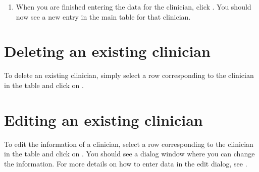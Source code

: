 \documentclass[letterpaper,10pt,english]{sphinxmanual}
\begin{document}
\begin{figure}[H]
\centering

\end{figure}
\begin{enumerate}
%
\setcounter{enumi}{3}
\item {} 
When you are finished entering the data for the clinician, click .
You should now see a new entry in the main table for that clinician.

\end{enumerate}

\begin{figure}[H]
\centering

\end{figure}


\section{Deleting an existing clinician}
\label{\detokenize{manual:deleting-an-existing-clinician}}
To delete an existing clinician, simply select a row corresponding
to the clinician in the table and click on .

\begin{figure}[H]
\centering

\end{figure}


\section{Editing an existing clinician}
\label{\detokenize{manual:editing-an-existing-clinician}}
To edit the information of a clinician, select a row corresponding
to the clinician in the table and click on . You should
see a dialog window where you can change the information. For more
details on how to enter data in the edit dialog, see {\hyperref[\detokenize{manual:adding-a-new-clinician}]{}}.

\begin{figure}[H]
\centering

\end{figure}
\end{document}
